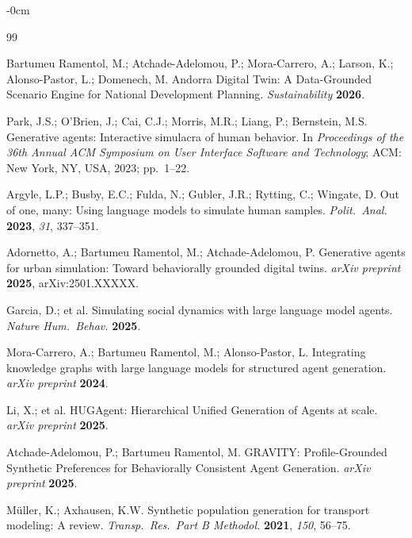 \documentclass[sustainability,article,submit,pdftex,moreauthors]{Definitions/mdpi}
\begin{document}
\begin{adjustwidth}{-\extralength}{0cm}


\begin{thebibliography}{99}

Bartumeu Ramentol, M.; Atchade-Adelomou, P.; Mora-Carrero, A.; Larson, K.;
Alonso-Pastor, L.; Domenech, M. Andorra Digital Twin: A Data-Grounded Scenario
Engine for National Development Planning. \textit{Sustainability} \textbf{2026}.

Park, J.S.; O'Brien, J.; Cai, C.J.; Morris, M.R.; Liang, P.; Bernstein, M.S.
Generative agents: Interactive simulacra of human behavior.
In \textit{Proceedings of the 36th Annual ACM Symposium on User Interface Software
and Technology}; ACM: New York, NY, USA, 2023; pp.~1--22.

Argyle, L.P.; Busby, E.C.; Fulda, N.; Gubler, J.R.; Rytting, C.; Wingate, D.
Out of one, many: Using language models to simulate human samples.
\textit{Polit.\ Anal.} \textbf{2023}, \textit{31}, 337--351.

Adornetto, A.; Bartumeu Ramentol, M.; Atchade-Adelomou, P.
Generative agents for urban simulation: Toward behaviorally grounded
digital twins. \textit{arXiv preprint} \textbf{2025}, arXiv:2501.XXXXX.

Garcia, D.; et al. Simulating social dynamics with large language model agents.
\textit{Nature Hum.\ Behav.} \textbf{2025}.

Mora-Carrero, A.; Bartumeu Ramentol, M.; Alonso-Pastor, L.
Integrating knowledge graphs with large language models for structured agent
generation. \textit{arXiv preprint} \textbf{2024}.

Li, X.; et al. HUGAgent: Hierarchical Unified Generation of Agents at scale.
\textit{arXiv preprint} \textbf{2025}.

Atchade-Adelomou, P.; Bartumeu Ramentol, M.
GRAVITY: Profile-Grounded Synthetic Preferences for Behaviorally Consistent
Agent Generation. \textit{arXiv preprint} \textbf{2025}.

M{\"u}ller, K.; Axhausen, K.W. Synthetic population generation for transport
modeling: A review. \textit{Transp.\ Res.\ Part B Methodol.} \textbf{2021},
\textit{150}, 56--75.


\end{thebibliography}
\end{adjustwidth}
\end{document}
